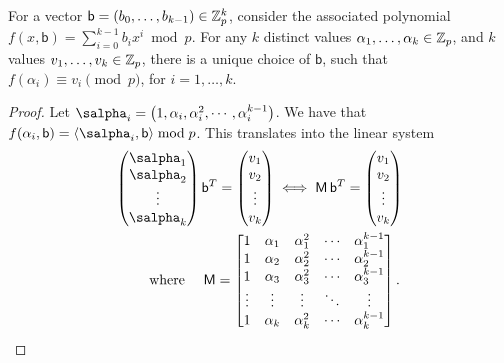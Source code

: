\begin{lemma}
    For a vector $\mathsf{b} = (b_0, \ldots, b_{k-1}) \in \mathbb{Z}_p^k$,
    consider the associated polynomial
    $f(x, \mathsf{b}) = \sum_{i=0}^{k-1} b_i x^{i} \bmod p$.  For any
    $k$ distinct values $\alpha_1, \ldots, \alpha_k \in \mathbb{Z}_p$, and
    $k$ values $v_1, \ldots, v_k \in \mathbb{Z}_p$, there is a unique
    choice of $\mathsf{b}$, such that $f(\alpha_i) \equiv v_i \pmod p$, for
    $i=1,\ldots, k$.
\end{lemma}

\begin{proof}
    Let
    $\salpha_i = \pth{1, \alpha_i, \alpha_{i}^2, \cdots,
       \alpha_{i}^{k-1}}$. We have that
    $f( \alpha_i , \mathsf{b}) = \DotProd{\salpha_i}{\mathsf{b}} \bmod
    p$. This translates into the linear system
    \begin{align*}
        &\pth{\begin{matrix}
            \salpha_1\\
            \salpha_2\\
            \vdots\\
            \salpha_k
        \end{matrix}}\, %
     \mathsf{b}^T = \pth{\begin{matrix}
            v_1\\
            v_2\\
            \vdots\\
            v_k
        \end{matrix}} \iff%
     \mathsf{M}\, \mathsf{b}^T = \pth{\begin{matrix}
            v_1\\
            v_2\\
            \vdots\\
            v_k
     \end{matrix}}
  \\
  &\qquad\text{ where }\quad%
     \mathsf{M} = %
     \begin{bmatrix}
       1 & \alpha_1 & \alpha_1^2 & \cdots & \alpha_1^{k-1}\\
       1 & \alpha_2 & \alpha_2^2 & \cdots & \alpha_2^{k-1}\\
       1 & \alpha_3 & \alpha_3^2 & \cdots & \alpha_3^{k-1}\\
       \vdots & \vdots & \vdots & \ddots &\vdots \\
       1 & \alpha_k & \alpha_k^2 & \cdots & \alpha_k^{k-1}
     \end{bmatrix}.

\end{align*}
\end{proof}
